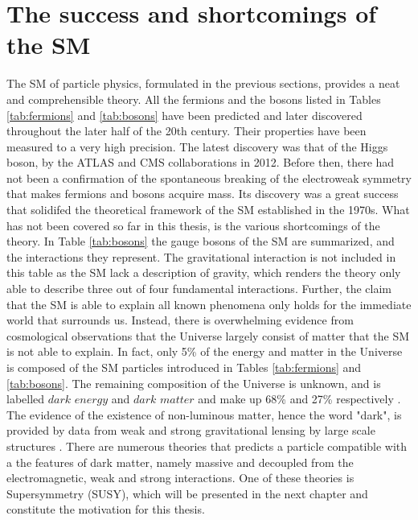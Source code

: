 \section{The success and shortcomings of the SM}
\noindent\justify
The SM of particle physics, formulated in the previous sections, provides a neat and comprehensible theory. 
All the fermions and the bosons listed in Tables \ref{tab:fermions} and \ref{tab:bosons} have been predicted and later discovered throughout the later half of the 20th century. 
Their properties have been measured to a very high precision.  
The latest discovery was that of the Higgs boson, by the ATLAS \cite{Aad:2012tfa} and CMS \cite{Chatrchyan:2012xdj} collaborations in 2012. 
Before then, there had not been a confirmation of the spontaneous breaking of the electroweak symmetry that makes fermions and bosons acquire mass. 
Its discovery was a great success that solidifed the theoretical framework of the SM established in the 1970s. 
What has not been covered so far in this thesis, is the various shortcomings of the theory. 
In Table \ref{tab:bosons} the gauge bosons of the SM are summarized, and the interactions they represent. 
The gravitational interaction is not included in this table as the SM lack a description of gravity, which renders the theory only able to describe three out of four fundamental interactions. 
\newpara
\noindent\justify
Further, the claim that the SM is able to explain all known phenomena only holds for the immediate world that surrounds us. 
Instead, there is overwhelming evidence from cosmological observations that the Universe largely consist of matter that the SM is not able to explain. 
In fact, only 5\% of the energy and matter in the Universe is composed of the SM particles introduced in Tables \ref{tab:fermions} and \ref{tab:bosons}. 
The remaining composition of the Universe is unknown, and is labelled $dark$ $energy$ and $dark$ $matter$ and make up 68\% and 27\% respectively \cite{Bertone:2004pz,Aguilar:2013qda,Peebles:2002gy}. 
The evidence of the existence of non-luminous matter, hence the word "dark", is provided by data from weak and strong gravitational lensing by large scale structures \cite{Refregier:2003ct,Tyson:1998vp}. 
There are numerous theories that predicts a particle compatible with a the features of dark matter, namely massive and decoupled from the electromagnetic, weak and strong interactions.
One of these theories is Supersymmetry (SUSY), which will be presented in the next chapter and constitute the motivation for this thesis. 
